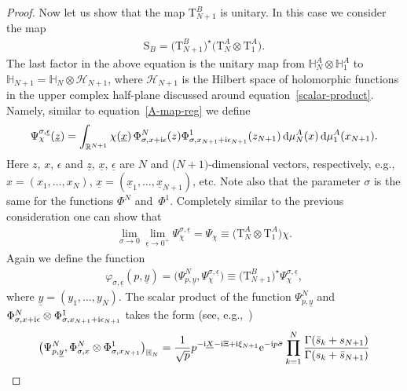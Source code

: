 \begin{proof}
Now let us show that the map $\mathrm T_{N+1}^B$ is unitary. In this case we consider the map
\begin{gather*}
\mathrm S_{B}=\big(\mathrm T_{N+1}^{B}\big)^{\star}\big(\mathrm T_{N}^A\otimes \mathrm T_1^A\big).
\end{gather*}
The last factor in the above equation is the unitary map from $\mathbb H_N^A\otimes \mathbb H_1^A$ to $\mathbb H_{N+1}=\mathbb
H_N\otimes\mathcal H_{N+1}$, where $\mathcal H_{N+1}$ is the Hilbert space of holomorphic functions in the upper complex half-plane
discussed around equation~\eqref{scalar-product}. Namely, similar to equation~\eqref{A-map-reg} we define
\begin{gather*}
\Psi^{\sigma,\underline{\epsilon}}_{\chi}(\underline{z})
=\int_{\mathbb R^{N+1}} \chi(\underline{x})\, \Phi^N_{{\sigma,x+{\rm i}\epsilon}}(z)\Phi^1_{{\sigma,x_{N+1}+{\rm i}\epsilon_{N+1}}}(z_{N+1})
\, {\rm d}\mu_{N}^{A}( x)\, {\rm d}\mu_1^A(x_{N+1}).
\end{gather*}
Here $z$, $x$, $\epsilon$ and $\underline z$, $\underline x$, $\underline \epsilon$ are $N$ and ($N+1)$-dimensional vectors, respectively, e.g.,
$x=(x_1,\dots,x_N)$, $\underline x=(\underline x_1,\dots,\underline x_{N+1})$, etc. Note also that the parameter $\sigma$ is the
same for the functions $\Phi^N$ and~$\Phi^1$. Completely similar to the previous consideration one can show that
\begin{gather*}
\lim_{\sigma\to0} \lim_{\underline{\epsilon}\to 0^+} \Psi^{\sigma,\underline{\epsilon}}_{\chi}
 =\Psi_{\chi} \equiv \big(\mathrm T_{N}^A\otimes \mathrm T_1^A\big)\chi.
\end{gather*}
Again we define the function
\begin{gather*}
\varphi_{\sigma,\underline \epsilon}(p,\underline y)
=\big(\Psi^N_{p,\underline y},\Psi^{\sigma,\underline\epsilon}_\chi\big)
\equiv \big(\mathrm T_{N+1}^{B}\big)^{\star} \Psi^{\sigma,\underline{\epsilon}}_{\chi},
\end{gather*}
where $\underline y =(y_1,\dots,y_N)$. The scalar product of the function $\Psi^N_{p,\underline y}$ and $\Phi^N_{{\sigma,x+{\rm i}\epsilon}}\otimes\Phi^1_{\sigma,x_{N+1}+{\rm i}\epsilon_{N+1}}$ takes the form (see, e.g.,~\cite{DMspinchainandSL2RGustafson})
\begin{gather*}
\big(\Psi^N_{p,\underline y},\Phi^N_{{\sigma,x}}\otimes\Phi^1_{\sigma,x_{N+1}}\big)_{\mathbb H_N} =
\frac1{\sqrt{p}} p^{-{\rm i}\underline X-{\rm i}\Xi +{\rm i}\xi_{N+1}} {\rm e}^{-{\rm i}p\bar\sigma}
\prod_{k=1}^N \frac{\Gamma(\bar s_k+s_{N+1})}{\Gamma(s_k+\bar s_{N+1})}

\end{gather*}
\end{proof}
